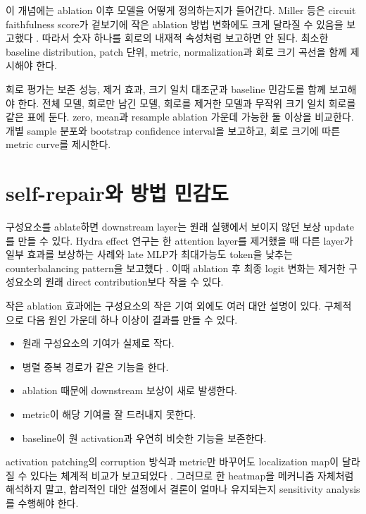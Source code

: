 이 개념에는 ablation 이후 모델을 어떻게 정의하는지가 들어간다.
Miller 등은 circuit faithfulness score가 겉보기에 작은 ablation 방법 변화에도 크게 달라질 수 있음을 보고했다 \citep{miller2024faithfulness}.
따라서 숫자 하나를 회로의 내재적 속성처럼 보고하면 안 된다.
최소한 baseline distribution, patch 단위, metric, normalization과 회로 크기 곡선을 함께 제시해야 한다.

\begin{studybox}[회로 평가의 권장 보고]
회로 평가는 보존 성능, 제거 효과, 크기 일치 대조군과 baseline 민감도를 함께 보고해야 한다.
전체 모델, 회로만 남긴 모델, 회로를 제거한 모델과 무작위 크기 일치 회로를 같은 표에 둔다.
zero, mean과 resample ablation 가운데 가능한 둘 이상을 비교한다.
개별 sample 분포와 bootstrap confidence interval을 보고하고, 회로 크기에 따른 metric curve를 제시한다.
\end{studybox}

\section{self-repair와 방법 민감도}

구성요소를 ablate하면 downstream layer는 원래 실행에서 보이지 않던 보상 update를 만들 수 있다.
Hydra effect 연구는 한 attention layer를 제거했을 때 다른 layer가 일부 효과를 보상하는 사례와 late MLP가 최대가능도 token을 낮추는 counterbalancing pattern을 보고했다 \citep{mcgrath2023hydra}.
이때 ablation 후 최종 logit 변화는 제거한 구성요소의 원래 direct contribution보다 작을 수 있다.

작은 ablation 효과에는 구성요소의 작은 기여 외에도 여러 대안 설명이 있다.
구체적으로 다음 원인 가운데 하나 이상이 결과를 만들 수 있다.

\begin{itemize}
  \item 원래 구성요소의 기여가 실제로 작다.
  \item 병렬 중복 경로가 같은 기능을 한다.
  \item ablation 때문에 downstream 보상이 새로 발생한다.
  \item metric이 해당 기여를 잘 드러내지 못한다.
  \item baseline이 원 activation과 우연히 비슷한 기능을 보존한다.
\end{itemize}

activation patching의 corruption 방식과 metric만 바꾸어도 localization map이 달라질 수 있다는 체계적 비교가 보고되었다 \citep{zhang2024activation}.
그러므로 한 heatmap을 메커니즘 자체처럼 해석하지 말고, 합리적인 대안 설정에서 결론이 얼마나 유지되는지 sensitivity analysis를 수행해야 한다.

